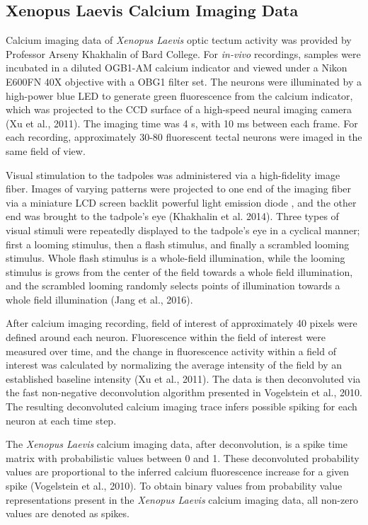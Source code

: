 \documentclass[11pt,titlepage]{article}
\begin{document}
\subsection{Xenopus Laevis Calcium Imaging Data}
Calcium imaging data of \textit{Xenopus Laevis} optic tectum activity was provided by Professor Arseny Khakhalin of Bard College. For \textit{in-vivo} recordings, samples were incubated in a diluted OGB1-AM calcium indicator and viewed under a Nikon E600FN 40X objective with a OBG1 filter set. The neurons were illuminated by a high-power blue LED to generate green fluorescence from the calcium indicator, which was projected to the CCD surface of a high-speed neural imaging camera (Xu et al., 2011). The imaging time was 4 s, with 10 ms between each frame. For each recording, approximately 30-80 fluorescent tectal neurons were imaged in the same field of view.\par
Visual stimulation to the tadpoles was administered via a high-fidelity image fiber. Images of varying patterns were projected to one end of the imaging fiber via a miniature LCD screen backlit powerful light emission diode , and the other end was brought to the tadpole's eye (Khakhalin et al. 2014). Three types of visual stimuli were repeatedly displayed to the tadpole's eye in a cyclical manner; first a looming stimulus, then a flash stimulus, and finally a scrambled looming stimulus. Whole flash stimulus is a whole-field illumination, while the looming stimulus is grows from the center of the field towards a whole field illumination, and the scrambled looming randomly selects points of illumination towards a whole field illumination (Jang et al., 2016).\par
After calcium imaging recording, field of interest of approximately 40 pixels were defined around each neuron. Fluorescence within the field of interest were measured over time, and the change in fluorescence activity within a field of interest was calculated by  normalizing the average intensity of the field by an established baseline intensity (Xu et al., 2011). The data is then deconvoluted via the fast non-negative deconvolution algorithm presented in Vogelstein et al., 2010. The resulting deconvoluted calcium imaging trace infers possible spiking for each neuron at each time step.\par
The \textit{Xenopus Laevis} calcium imaging data, after deconvolution, is a spike time matrix with probabilistic values between 0 and 1. These deconvoluted probability values are proportional to the inferred calcium fluorescence increase for a given spike (Vogelstein et al., 2010). To obtain binary values from probability value representations present in the \textit{Xenopus Laevis} calcium imaging data, all non-zero values are denoted as spikes.\par
\end{document}
